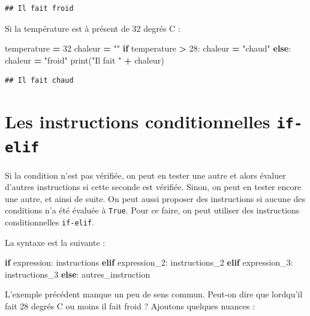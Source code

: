 \documentclass[12pt,]{book}
\newenvironment{Shaded}{\begin{snugshade}}{\end{snugshade}}
\newcommand{\DecValTok}[1]{\textcolor[rgb]{0.00,0.00,0.81}{#1}}
\newcommand{\StringTok}[1]{\textcolor[rgb]{0.31,0.60,0.02}{#1}}
\newcommand{\ControlFlowTok}[1]{\textcolor[rgb]{0.13,0.29,0.53}{\textbf{#1}}}
\newcommand{\OperatorTok}[1]{\textcolor[rgb]{0.81,0.36,0.00}{\textbf{#1}}}
\newcommand{\BuiltInTok}[1]{#1}
\newcommand{\NormalTok}[1]{#1}
\numberwithin{equation}{section}
\numberwithin{countremarque}{section}
\begin{document}
\begin{lstlisting}
## Il fait froid
\end{lstlisting}

Si la température est à présent de 32 degrés C :

\begin{Shaded}
\begin{Highlighting}[]
\NormalTok{temperature }\OperatorTok{=} \DecValTok{32}
\NormalTok{chaleur }\OperatorTok{=} \StringTok{""}
\ControlFlowTok{if}\NormalTok{ temperature }\OperatorTok{>} \DecValTok{28}\NormalTok{:}
\NormalTok{  chaleur }\OperatorTok{=} \StringTok{"chaud"}
\ControlFlowTok{else}\NormalTok{:}
\NormalTok{  chaleur }\OperatorTok{=} \StringTok{"froid"}
\BuiltInTok{print}\NormalTok{(}\StringTok{"Il fait "} \OperatorTok{+}\NormalTok{ chaleur)}
\end{Highlighting}
\end{Shaded}

\begin{lstlisting}
## Il fait chaud
\end{lstlisting}

\section{\texorpdfstring{Les instructions conditionnelles
\texttt{if-elif}}{Les instructions conditionnelles if-elif}}\label{les-instructions-conditionnelles-if-elif}

Si la condition n'est pas vérifiée, on peut en tester une autre et alors
évaluer d'autres instructions si cette seconde est vérifiée. Sinon, on
peut en tester encore une autre, et ainsi de suite. On peut aussi
proposer des instructions si aucune des conditions n'a été évaluée à
\texttt{True}. Pour ce faire, on peut utiliser des instructions
conditionnelles \texttt{if-elif}.

La syntaxe est la suivante :

\begin{Shaded}
\begin{Highlighting}[]
\ControlFlowTok{if}\NormalTok{ expression:}
\NormalTok{  instructions}
\ControlFlowTok{elif}\NormalTok{ expression_2:}
\NormalTok{  instructions_2}
\ControlFlowTok{elif}\NormalTok{ expression_3:}
\NormalTok{  instructions_3}
\ControlFlowTok{else}\NormalTok{:}
\NormalTok{  autres_instruction}
\end{Highlighting}
\end{Shaded}

L'exemple précédent manque un peu de sens commun. Peut-on dire que
lordqu'il fait 28 degrés C ou moins il fait froid ? Ajoutons quelques
nuances :
\end{document}
